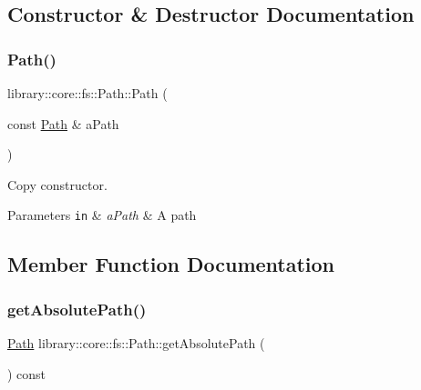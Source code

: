 \subsection{Constructor \& Destructor Documentation}
\mbox{\label{classlibrary_1_1core_1_1fs_1_1_path_aabc4240fc08479d1bff6b9753f2b5cc2}} 
\subsubsection{\texorpdfstring{Path()}{Path()}}
{\footnotesize\ttfamily library\+::core\+::fs\+::\+Path\+::\+Path (\begin{DoxyParamCaption}\item[{const \hyperlink{classlibrary_1_1core_1_1fs_1_1_path}{Path} \&}]{a\+Path }\end{DoxyParamCaption})}



Copy constructor. 


\begin{DoxyParams}[1]{Parameters}
\mbox{\tt in}  & {\em a\+Path} & A path \\
\hline
\end{DoxyParams}


\subsection{Member Function Documentation}
\mbox{\label{classlibrary_1_1core_1_1fs_1_1_path_a09dc880115d1e0a9079ac8e106e82c92}} 
\subsubsection{\texorpdfstring{get\+Absolute\+Path()}{getAbsolutePath()}}
{\footnotesize\ttfamily \hyperlink{classlibrary_1_1core_1_1fs_1_1_path}{Path} library\+::core\+::fs\+::\+Path\+::get\+Absolute\+Path (\begin{DoxyParamCaption}{ }\end{DoxyParamCaption}) const}




